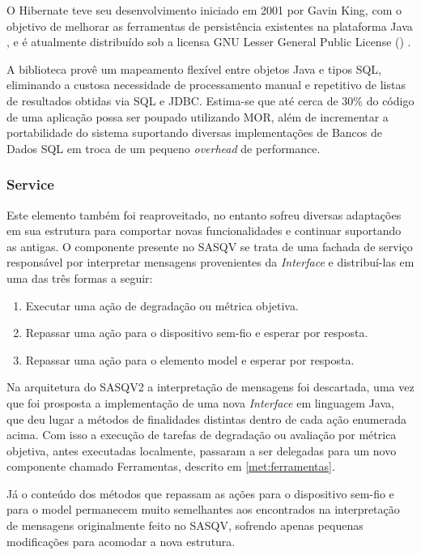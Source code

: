 O Hibernate teve seu desenvolvimento iniciado em 2001 por Gavin King, com o objetivo de melhorar as ferramentas de persistência existentes na plataforma Java \cite{hibernateHistory}, e é atualmente distribuído sob a licensa GNU Lesser General Public License () \cite{hibernateAbout}.

A biblioteca provê um mapeamento flexível entre objetos Java e tipos SQL, eliminando a custosa necessidade de processamento manual e repetitivo de listas de resultados obtidas via SQL e JDBC.
Estima-se que até cerca de 30\% do código de uma aplicação possa ser poupado utilizando MOR, além de incrementar a portabilidade do sistema suportando diversas implementações de Bancos de Dados SQL em troca de um pequeno \emph{overhead} de performance.

\subsubsection{Service}

Este elemento também foi reaproveitado, no entanto sofreu diversas adaptações em sua estrutura para comportar novas funcionalidades e continuar suportando as antigas.
O componente presente no SASQV se trata de uma fachada de serviço responsável por interpretar mensagens provenientes da \emph{Interface} e distribuí-las em uma das três formas a seguir:

\begin{enumerate}
	\item Executar uma ação de degradação ou métrica objetiva.
	\item Repassar uma ação para o dispositivo sem-fio e esperar por resposta.
	\item Repassar uma ação para o elemento model e esperar por resposta.
\end{enumerate}

Na arquitetura do SASQV2 a interpretação de mensagens foi descartada, uma vez que foi prosposta a implementação de uma nova \emph{Interface} em linguagem Java, que deu lugar a métodos de finalidades distintas dentro de cada ação enumerada acima. 
Com isso a execução de tarefas de degradação ou avaliação por métrica objetiva, antes executadas localmente, passaram a ser delegadas para um novo componente chamado Ferramentas, descrito em \ref{met:ferramentas}.

Já o conteúdo dos métodos que repassam as ações para o dispositivo sem-fio e para o model permanecem muito semelhantes aos encontrados na interpretação de mensagens originalmente feito no SASQV, sofrendo apenas pequenas modificações para acomodar a nova estrutura.


